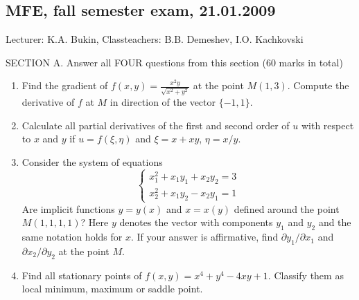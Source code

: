 \documentclass[12pt]{article} %
\theoremstyle{definition} %
\begin{document}
\subsection{MFE, fall semester exam, 21.01.2009}

Lecturer: K.A. Bukin, Classteachers: B.B. Demeshev, I.O. Kachkovski


SECTION A. Answer all FOUR questions from this section (60 marks in total)

\begin{enumerate}
\item Find the gradient of $f(x,y) =\frac{x^2y}{\sqrt{x^2+y^2}}$
at the point $M(1,3)$. Compute the derivative of $f$ at $M$ in direction of the vector $\{-1, 1\}$.

\item Calculate all partial derivatives of the first and second order of $u$ with respect to $x$ and $y$ if $u=f (\xi, \eta)$ and $\xi=x+xy$, $\eta=x/y$.

\item Consider the system of equations
\[
\left\{
\begin{array}{l}
x_1^2+x_1 y_1+x_2 y_2  = 3 \\
x_2^2+x_1 y_2 -x_2 y_1 =1
\end{array}
\right.
\]
Are implicit functions $y = y(x)$ and $x = x(y)$ defined around the point $M(1, 1, 1, 1)$?
Here $y$ denotes the vector with components $y_1$ and $y_2$ and the same notation holds for $x$.
If your answer is affirmative, find $\partial y_1/\partial x_1$ and $\partial x_2/\partial y_2$ at the point $M$.

\item Find all stationary points of $f(x,y) = x^4 + y^4-4xy + 1$. Classify them as local minimum, maximum or saddle point.
\end{enumerate}
\end{document}
